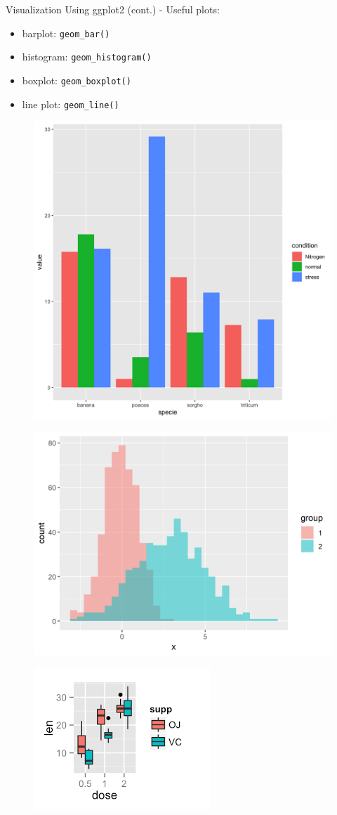 \documentclass{beamer}
\begin{document}
\begin{frame}[fragile]{Visualization Using ggplot2 (cont.)}
- Useful plots:
\begin{itemize}
    \item barplot: \texttt{geom\_bar()} 
    \item histogram: \texttt{geom\_histogram()}
    \item boxplot: \texttt{geom\_boxplot()}
    \item line plot: \texttt{geom\_line()}
\end{itemize}

\begin{figure}
\centering
\begin{minipage}{.5\textwidth}
  \centering
  \includegraphics[width=.5\linewidth]{eg_bar.png}
  \label{fig:test1}
\end{minipage}%
\begin{minipage}{.5\textwidth}
  \centering
  \includegraphics[width=.7\linewidth]{eg_hist.png}
  \label{fig:test2}
\end{minipage}
\begin{minipage}{.5\textwidth}
  \centering
  \includegraphics[width=.8\linewidth]{eg_box.png}

\end{minipage}
\end{figure}
\end{frame}
\end{document}
